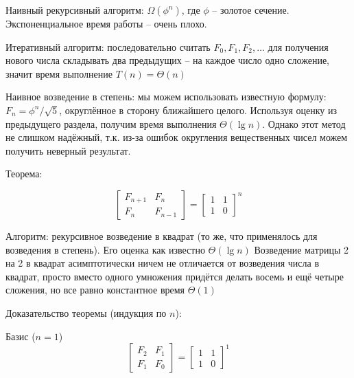 \documentclass[a4paper,11pt]{article}
\begin{document}
Наивный рекурсивный алгоритм: $\Omega(\phi^n)$, где $\phi$ -- золотое сечение.
Экспоненциальное время работы -- очень плохо.

Итеративный алгоритм: последовательно считать $F_0, F_1, F_2, \ldots$ для
получения нового числа складывать два предыдущих -- на каждое число одно
сложение, значит время выполнение $T(n) = \Theta(n)$

Наивное возведение в степень: мы можем использовать известную формулу: $F_n =
\phi^n / \sqrt{5}$, округлённое в сторону ближайшего целого. Используя оценку из
предыдущего раздела, получим время выполнения $\Theta(\lg n)$. Однако этот метод
не слишком надёжный, т.к. из-за ошибок округления вещественных чисел можем
получить неверный результат.

Теорема:

\begin{equation*}
\begin{bmatrix}
  F_{n+1} & F_n \\
  F_n     & F_{n-1}
\end{bmatrix} =
\begin{bmatrix}
  1 & 1 \\
  1 & 0
\end{bmatrix}^n
\end{equation*}

Алгоритм: рекурсивное возведение в квадрат (то же, что применялось для
возведения в степень). Его оценка как известно $\Theta(\lg n)$
Возведение матрицы 2 на 2 в квадрат асимптотически ничем не отличается от
возведения числа в квадрат, просто вместо одного умножения придётся делать
восемь и ещё четыре сложения, но все равно константное время $\Theta(1)$

Доказательство теоремы (индукция по $n$):

Базис ($n=1$)
\begin{equation*}
\begin{bmatrix}
  F_2 & F_1 \\
  F_1 & F_0
\end{bmatrix} =
\begin{bmatrix}
  1 & 1 \\
  1 & 0
\end{bmatrix}^1
\end{equation*}
\end{document}
